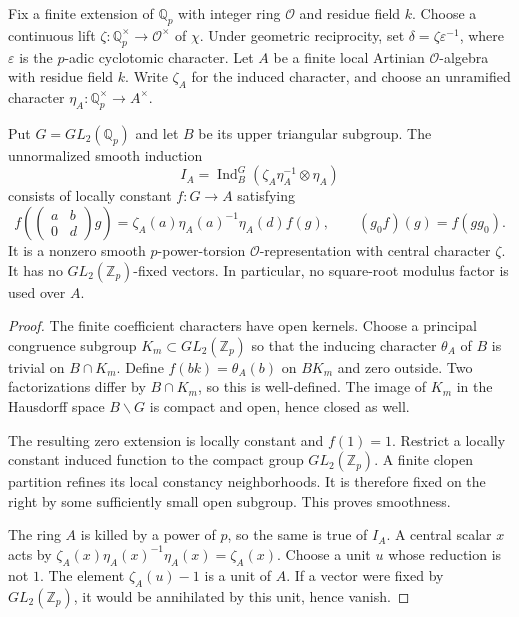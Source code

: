 \begin{proposition}
\label{v4-arith:ic:w5-e:local:ramified-source}
Fix a finite extension of $\mathbb Q_p$ with integer ring $\mathcal O$
and residue field $k$. Choose a continuous lift
$\zeta:\mathbb Q_p^\times\to\mathcal O^\times$ of $\chi$.
Under geometric reciprocity, set $\delta=\zeta\varepsilon^{-1}$,
where $\varepsilon$ is the $p$-adic cyclotomic character. Let $A$ be a finite local Artinian $\mathcal O$-algebra
with residue field $k$. Write $\zeta_A$ for the induced character,
and choose an unramified character $\eta_A:\mathbb Q_p^\times\to A^\times$.

Put $G=GL_2(\mathbb Q_p)$ and let $B$ be its upper triangular subgroup.
The unnormalized smooth induction
\[
 I_A=\operatorname{Ind}_B^G(\zeta_A\eta_A^{-1}\otimes\eta_A)
\]
consists of locally constant $f:G\to A$ satisfying
\[
 f\left(\begin{pmatrix}a&b\\0&d\end{pmatrix}g\right)
 =\zeta_A(a)\eta_A(a)^{-1}\eta_A(d)f(g),
 \qquad (g_0f)(g)=f(gg_0).
\]
It is a nonzero smooth $p$-power-torsion $\mathcal O$-representation
with central character $\zeta$. It has no $GL_2(\mathbb Z_p)$-fixed
vectors. In particular, no square-root modulus factor is used over $A$.
\end{proposition}
\begin{proof}
The finite coefficient characters have open kernels. Choose a principal
congruence subgroup $K_m\subset GL_2(\mathbb Z_p)$ so that the inducing
character $\theta_A$ of $B$ is trivial on $B\cap K_m$.
Define $f(bk)=\theta_A(b)$ on $BK_m$ and zero outside. Two
factorizations differ by $B\cap K_m$, so this is well-defined.
The image of $K_m$ in the Hausdorff space $B\backslash G$ is compact
and open, hence closed as well.

The resulting zero extension is
locally constant and $f(1)=1$.
Restrict a locally constant induced function to the compact group
$GL_2(\mathbb Z_p)$. A finite clopen partition refines its local
constancy neighborhoods. It is therefore fixed on the right by
some sufficiently small open subgroup. This proves
smoothness.

The ring $A$ is killed by a power of $p$, so the same is
true of $I_A$. A central scalar $x$ acts by
$\zeta_A(x)\eta_A(x)^{-1}\eta_A(x)=\zeta_A(x)$.
Choose a unit $u$ whose reduction is not $1$. The element
$\zeta_A(u)-1$ is a unit of $A$. If a vector were fixed by
$GL_2(\mathbb Z_p)$, it would be annihilated by this unit, hence vanish.
\end{proof}

